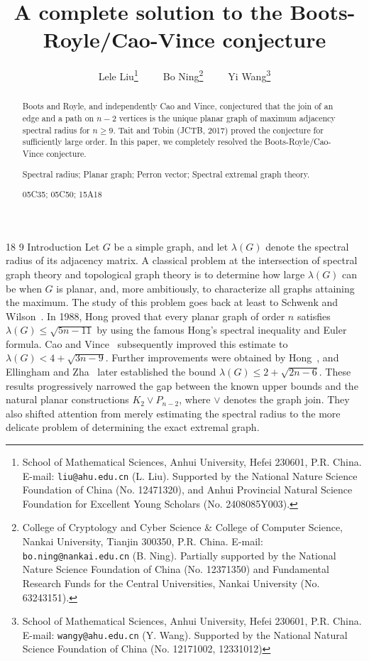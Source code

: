 \documentclass[11pt]{article}
\title{A complete solution to the Boots-Royle/Cao-Vince conjecture}
\author{Lele Liu\footnote{School of Mathematical Sciences, Anhui University, Hefei 230601,
P.R. China. E-mail: \texttt{liu@ahu.edu.cn} (L. Liu). Supported by the National
Nature Science Foundation of China (No. 12471320), and Anhui Provincial Natural Science Foundation for Excellent Young Scholars (No. 2408085Y003).}\,~~~~
Bo Ning\footnote{College of Cryptology and Cyber Science \& College of Computer Science, Nankai University, Tianjin 300350, P.R. China.
E-mail: \texttt{bo.ning@nankai.edu.cn} (B. Ning). Partially supported by the National Nature Science
Foundation of China (No. 12371350) and Fundamental Research Funds for the Central Universities, Nankai University (No. 63243151).}\,~~~~
Yi Wang\footnote{School of Mathematical Sciences, Anhui University, Hefei 230601,
P.R. China. E-mail: \texttt{wangy@ahu.edu.cn} (Y. Wang).
Supported by the National Natural Science Foundation of China (No. 12171002, 12331012)}
}
\date{}
\makeatletter
\renewcommand\section{\@startsection{section}{1}{\z@}%
{18\p@ \@plus 6\p@ \@minus 3\p@}%
{9\p@ \@plus 6\p@ \@minus 3\p@}%
{\large\bfseries\boldmath}}
\theoremstyle{plain}
\theoremstyle{definition}
\numberwithin{equation}{section}
\makeatother
\begin{document}
\maketitle

\begin{abstract}
Boots and Royle, and independently Cao and Vince, conjectured that the join of an edge and a path 
on $n-2$ vertices is the unique planar graph of maximum adjacency spectral radius for $n\geq 9$. 
Tait and Tobin (JCTB, 2017) proved the conjecture for sufficiently large order. In this paper, 
we completely resolved the Boots-Royle/Cao-Vince conjecture.
\par\vspace{2mm}
 Spectral radius; Planar graph; Perron vector; Spectral extremal graph theory.
\par\vspace{2mm}
 05C35; 05C50; 15A18
\end{abstract}



\section{Introduction}
Let $G$ be a simple graph, and let $\lambda(G)$ denote the spectral radius of its
adjacency matrix. A classical problem at the intersection of spectral graph
theory and topological graph theory is to determine how large $\lambda(G)$ can be
when $G$ is planar, and, more ambitiously, to characterize all graphs attaining
the maximum. The study of this problem goes back at least to Schwenk and
Wilson~\cite{SchwenkWilson1978}. In 1988, Hong \cite{Hong1988} proved that every planar
graph of order $n$ satisfies $\lambda(G)\leq \sqrt{5n-11}$ by using the famous Hong's spectral 
inequality and Euler formula. Cao and Vince~\cite{CaoVince1993} subsequently improved this
estimate to $\lambda(G) < 4 + \sqrt{3n-9}$. Further improvements were obtained by 
Hong~\cite{Hong1995,Hong1998}, and Ellingham and Zha~\cite{EllinghamZha2000} later established the bound
$\lambda(G)\leq 2+\sqrt{2n-6}$. These results progressively narrowed the gap between the known upper bounds
and the natural planar constructions $K_2\vee P_{n-2}$, where $\vee$ denotes the graph join. They also shifted attention from merely
estimating the spectral radius to the more delicate problem of determining the exact extremal graph.
\end{document}
